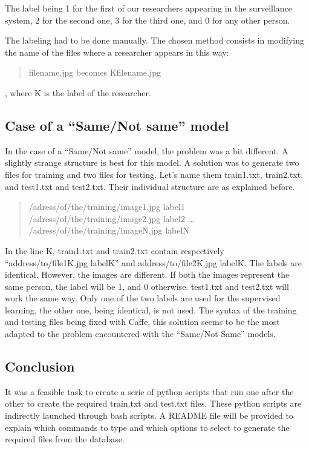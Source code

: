 The label being 1 for the first of our researchers appearing in the surveillance system, 2 for the second one, 3 for the third one, and 0 for any other person.

The labeling had to be done manually. The chosen method consists in modifying the name of the files where a researcher appears in this way:

\blockquote{filename.jpg becomes Kfilename.jpg}, where K is the label of the researcher.


\subsection{Case of a \enquote{Same/Not same} model}

In the case of a \enquote{Same/Not same} model, the problem was a bit different. A slightly strange structure is best for this model. A solution was to generate two files for training and two files for testing. Let's name them train1.txt, train2.txt, and test1.txt and test2.txt. Their individual structure are as explained before.

\blockquote{/adress/of/the/training/image1.jpg label1\newline
/adress/of/the/training/image2.jpg label2\newline
...\newline
/adress/of/the/training/imageN.jpg labelN}

In the line K, train1.txt and train2.txt contain respectively \enquote{address/to/file1K.jpg labelK} and {address/to/file2K.jpg labelK}. The labels are identical. However, the images are different. If both the images represent the same person, the label will be 1, and 0 otherwise. test1.txt and test2.txt will work the same way. Only one of the two labels are used for the supervised learning, the other one, being identical, is not used. The syntax of the training and testing files being fixed with Caffe, this solution seems to be the most adapted to the problem encountered with the \enquote{Same/Not Same} models.


\subsection{Conclusion}
It was a feasible task to create a serie of python scripts that run one after the other to create the required train.txt and test.txt files. These python scripts are indirectly launched through bash scripts. A README file will be provided to explain which commands to type and which options to select to generate the required files from the database.\\

